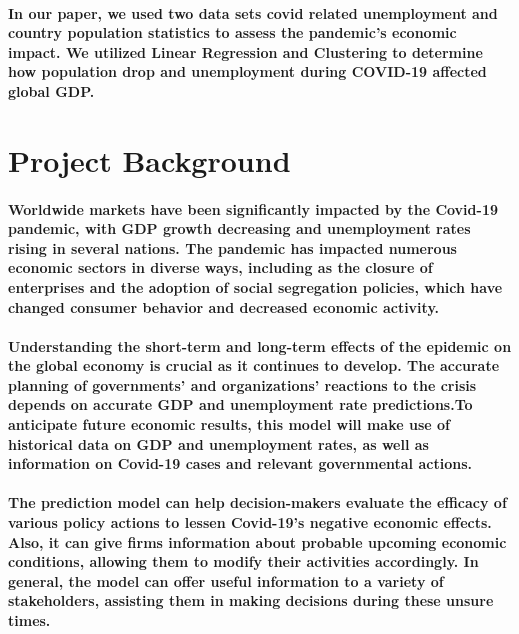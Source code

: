 \documentclass{article}
\begin{document}
\paragraph{ In our paper, we used two data sets covid related unemployment 
and country population statistics to assess the pandemic’s economic impact. 
We utilized Linear Regression and Clustering to determine how population drop 
and unemployment during COVID-19 affected global GDP.
}

\section{Project Background}
    
\paragraph{Worldwide markets have been significantly impacted by the Covid-19 pandemic, with GDP growth decreasing and unemployment rates rising in several nations. The pandemic has impacted numerous economic sectors in diverse ways, including as the closure of enterprises and the adoption of social segregation policies, which have changed consumer behavior and decreased economic activity.
}
\paragraph{Understanding the short-term and long-term effects of the epidemic on the global economy is crucial as it continues to develop. The accurate planning of governments' and organizations' reactions to the crisis depends on accurate GDP and unemployment rate predictions.To anticipate future economic results, this model will make use of historical data on GDP and unemployment rates, as well as information on Covid-19 cases and relevant governmental actions.
} 
\paragraph{
The prediction model can help decision-makers evaluate the efficacy of various policy actions to lessen Covid-19's negative economic effects. Also, it can give firms information about probable upcoming economic conditions, allowing them to modify their activities accordingly. In general, the model can offer useful information to a variety of stakeholders, assisting them in making decisions during these unsure times.
}
\end{document}
